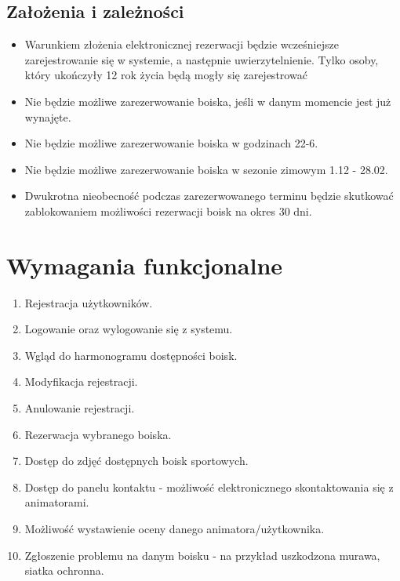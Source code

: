 \documentclass[a4paper,11pt]{article}
\begin{document}
\subsection {Założenia i zależności}
\begin{itemize}
	\item Warunkiem złożenia elektronicznej rezerwacji będzie 			wcześniejsze zarejestrowanie się w systemie, a następnie uwierzytelnienie. Tylko osoby, który ukończyły 12 rok życia będą mogły się zarejestrować
	\item Nie będzie możliwe zarezerwowanie boiska, jeśli w danym momencie jest już wynajęte.
	\item Nie będzie możliwe zarezerwowanie boiska w godzinach 22-6.
	\item Nie będzie możliwe zarezerwowanie boiska w sezonie zimowym 1.12 - 28.02.
	\item Dwukrotna nieobecność podczas zarezerwowanego terminu będzie skutkować zablokowaniem możliwości rezerwacji boisk na okres 30 dni.
\end{itemize}

\section {Wymagania funkcjonalne}
\begin{enumerate}
	\item Rejestracja użytkowników.
	\item Logowanie oraz wylogowanie się z systemu.
	\item Wgląd do harmonogramu dostępności boisk.
	\item Modyfikacja rejestracji.
	\item Anulowanie rejestracji.
	\item Rezerwacja wybranego boiska.
	\item Dostęp do zdjęć dostępnych boisk sportowych.
	\item Dostęp do panelu kontaktu - możliwość elektronicznego skontaktowania się z animatorami.
	\item Możliwość wystawienie oceny danego animatora/użytkownika. 
	\item Zgłoszenie problemu na danym boisku - na przykład uszkodzona murawa, siatka ochronna.
\end{enumerate}
\end{document}
